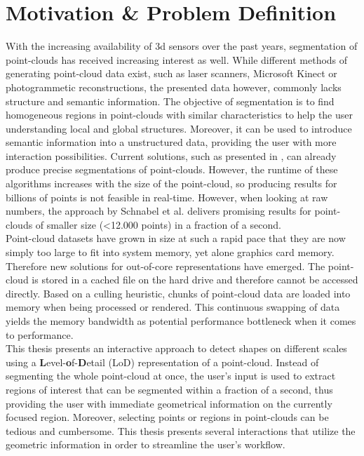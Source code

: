 \section{Motivation \& Problem Definition}

With the increasing availability of 3d sensors over the past years, segmentation of point-clouds has received increasing interest as well. While different methods of generating point-cloud data exist, such as laser scanners, Microsoft Kinect or photogrammetic reconstructions, the presented data however, commonly lacks structure and semantic information. The objective of segmentation is to find homogeneous regions in point-clouds with similar characteristics to help the user understanding local and global structures. Moreover, it can be used to introduce semantic information into a unstructured data, providing the user with more interaction possibilities. Current solutions, such as presented in \cite{schnabel-2007-efficient}, \cite{schnabel-2007-ransac} can already produce precise segmentations of point-clouds. However, the runtime of these algorithms increases with the size of the point-cloud, so producing results for billions of points is not feasible in real-time. However, when looking at raw numbers, the approach by Schnabel et al. \cite{schnabel-2007-ransac} delivers promising results for point-clouds of smaller size (\textless 12.000 points) in a fraction of a second. 
\\
Point-cloud datasets have grown in size at such a rapid pace that they are now simply too large to fit into system memory, yet alone graphics card memory. Therefore new solutions for out-of-core representations have emerged. The point-cloud is stored in a cached file on the hard drive and therefore cannot be accessed directly. Based on a culling heuristic, chunks of point-cloud data are loaded into memory when being processed or rendered. This continuous swapping of data yields the memory bandwidth as potential performance bottleneck when it comes to performance.
\\
This thesis presents an interactive approach to detect shapes on different scales using a \textbf{L}evel-\textbf{o}f-\textbf{D}etail (LoD) representation of a point-cloud. Instead of segmenting the whole point-cloud at once, the user's input is used to extract regions of interest that can be segmented within a fraction of a second, thus providing the user with immediate geometrical information on the currently focused region. Moreover, selecting points or regions in point-clouds can be tedious and cumbersome. This thesis presents several interactions that utilize the geometric information in order to streamline the user's workflow. 